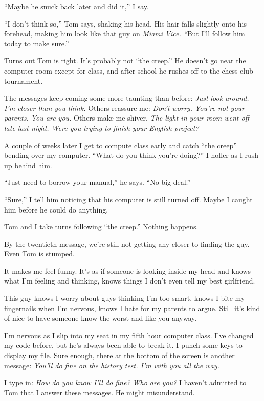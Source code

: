\documentclass[
]{article}
\begin{document}
``Maybe he snuck back later and did it,'' I say.

``I don't think so,'' Tom says, shaking his head. His hair falls
slightly onto his forehead, making him look like that guy on \emph{Miami
Vice. ``}But I'll follow him today to make sure.''

Turns out Tom is right. It's probably not ``the creep.'' He doesn't go
near the computer room except for class, and after school he rushes off
to the chess club tournament.

The messages keep coming some more taunting than before: \emph{Just look
around. I'm closer than you think.} Others reassure me: \emph{Don't
worry. You're not your parents. You are you.} Others make me shiver.
\emph{The light in your room went off late last night. Were you trying
to finish your English project?}

A couple of weeks later I get to compute class early and catch ``the
creep'' bending over my computer. ``What do you think you're doing?'' I
holler as I rush up behind him.

``Just need to borrow your manual,'' he says. ``No big deal.''

``Sure,'' I tell him noticing that his computer is still turned off.
Maybe I caught him before he could do anything.

Tom and I take turns following ``the creep.'' Nothing happens.

By the twentieth message, we're still not getting any closer to finding
the guy. Even Tom is stumped.

It makes me feel funny. It's as if someone is looking inside my head and
knows what I'm feeling and thinking, knows things I don't even tell my
best girlfriend.

This guy knows I worry about guys thinking I'm too smart, knows I bite
my fingernails when I'm nervous, knows I hate for my parents to argue.
Still it's kind of nice to have someone know the worst and like you
anyway.

I'm nervous as I slip into my seat in my fifth hour computer class. I've
changed my code before, but he's always been able to break it. I punch
some keys to display my file. Sure enough, there at the bottom of the
screen is another message: \emph{You'll do fine on the history test. I'm
with you all the way.}

I type in: \emph{How do you know I'll do fine? Who are you?} I haven't
admitted to Tom that I answer these messages. He might misunderstand.
\end{document}
